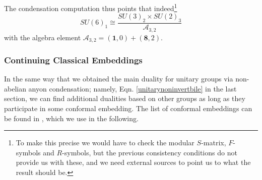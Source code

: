 \documentclass[11pt]{article}
\numberwithin{equation}{section}
\begin{document}
The condensation computation thus points that indeed\footnote{To make this precise we would have to check the modular $S$-matrix, $F$-symbols and $R$-symbols, but the previous consistency conditions do not provide us with these, and we need external sources to point us to what the result should be.}
\begin{equation}
    \boxed{SU(6)_{1} \cong \frac{SU(3)_{2} \times SU(2)_{3}}{\mathcal{A}_{3,2}}}
\end{equation}
with the algebra element $\mathcal{A}_{3,2} = (\mathbf{1},0) + (\mathbf{8},2)$.

\subsubsection{Continuing Classical Embeddings} \label{continuingclassicalembeddings}

In the same way that we obtained the main duality for unitary groups via non-abelian anyon condensation; namely, Eqn. \eqref{unitarynoninvertbile} in the last section, we can find additional dualities based on other groups as long as they participate in some conformal embedding. The list of conformal embeddings can be found in \cite{davydov2013witt}, which we use in the following. 
\end{document}
